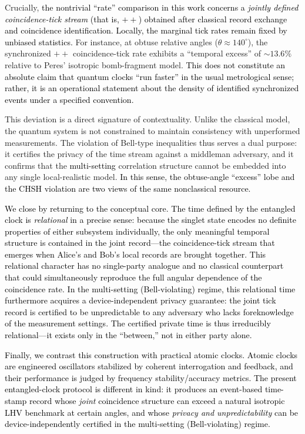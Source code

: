 \documentclass[reprint,aps,pra,longbibliography]{revtex4-2}
\newcommand{\rev}[1]{\textcolor{black}{#1}} %
\newcommand{\revG}[1]{\textcolor{black}{#1}} %
\newcommand{\revA}[1]{\textcolor{black}{#1}} %
\begin{document}
Crucially, \rev{the nontrivial ``rate'' comparison in this work concerns a \emph{jointly defined coincidence-tick stream} (that is, $++$) obtained after classical record exchange and coincidence identification. Locally, the marginal tick rates remain fixed by unbiased statistics.} For instance, at obtuse relative angles ($\theta \approx 140^\circ$), the synchronized $++$ coincidence-tick rate exhibits a ``temporal excess'' of ${\sim}13.6\%$ relative to Peres' isotropic bomb-fragment model. \rev{This does not constitute an absolute claim that quantum clocks ``run faster'' in the usual metrological sense; rather, it is an operational statement about the density of identified synchronized events under a specified convention.}

This deviation is a direct signature of contextuality. Unlike the classical model, the quantum system is not constrained to maintain consistency with unperformed measurements. The violation of Bell-type inequalities thus serves a dual purpose: it certifies the privacy of the time stream against a middleman adversary, and it confirms that the \rev{multi-setting} correlation structure cannot be embedded into any single local-realistic model. \rev{In this sense, the obtuse-angle ``excess'' lobe and the CHSH violation are two views of the same nonclassical resource.}

\revA{We close by returning to the conceptual core. The time defined by the entangled clock is \emph{relational} in a precise sense: because the singlet state encodes no definite properties of either subsystem individually, the only meaningful temporal structure is contained in the joint record---the coincidence-tick stream that emerges when Alice's and Bob's local records are brought together. This relational character has no single-party analogue and no classical counterpart that could simultaneously reproduce the full angular dependence of the coincidence rate. In the multi-setting (Bell-violating) regime, this relational time furthermore acquires a device-independent privacy guarantee: the joint tick record is certified to be unpredictable to any adversary who lacks foreknowledge of the measurement settings. The certified private time is thus irreducibly relational---it exists only in the ``between,'' not in either party alone.}

\revG{Finally, we contrast this construction with practical atomic clocks. Atomic clocks are engineered oscillators stabilized by coherent interrogation and feedback, and their performance is judged by frequency stability/accuracy metrics. The present entangled-clock protocol is different in kind: it produces an event-based time-stamp record whose \emph{joint} coincidence structure can exceed a natural isotropic LHV benchmark at certain angles, and whose \emph{privacy and unpredictability} can be device-independently certified in the multi-setting (Bell-violating) regime.}
\end{document}
